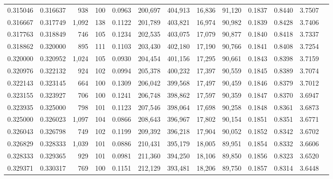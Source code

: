 \begin{tabular}{rrrrrrrrrrrrr}
0.315046 & 0.316637 &    938 &   100 &                                     0.0963 & 200,697 & 404,913 &  16,836 &  91,120 & 0.1837 & 0.8440 & 3.7507 \\
0.316667 & 0.317749 &  1,092 &   138 &                                     0.1122 & 201,789 & 403,821 &  16,974 &  90,982 & 0.1839 & 0.8428 & 3.7406 \\
0.317763 & 0.318849 &    746 &   105 &                                     0.1234 & 202,535 & 403,075 &  17,079 &  90,877 & 0.1840 & 0.8418 & 3.7337 \\
0.318862 & 0.320000 &    895 &   111 &                                     0.1103 & 203,430 & 402,180 &  17,190 &  90,766 & 0.1841 & 0.8408 & 3.7254 \\
0.320000 & 0.320952 &  1,024 &   105 &                                     0.0930 & 204,454 & 401,156 &  17,295 &  90,661 & 0.1843 & 0.8398 & 3.7159 \\
0.320976 & 0.322132 &    924 &   102 &                                     0.0994 & 205,378 & 400,232 &  17,397 &  90,559 & 0.1845 & 0.8389 & 3.7074 \\
0.322143 & 0.323145 &    664 &   100 &                                     0.1309 & 206,042 & 399,568 &  17,497 &  90,459 & 0.1846 & 0.8379 & 3.7012 \\
0.323155 & 0.323927 &    706 &   100 &                                     0.1241 & 206,748 & 398,862 &  17,597 &  90,359 & 0.1847 & 0.8370 & 3.6947 \\
0.323935 & 0.325000 &    798 &   101 &                                     0.1123 & 207,546 & 398,064 &  17,698 &  90,258 & 0.1848 & 0.8361 & 3.6873 \\
0.325000 & 0.326023 &  1,097 &   104 &                                     0.0866 & 208,643 & 396,967 &  17,802 &  90,154 & 0.1851 & 0.8351 & 3.6771 \\
0.326043 & 0.326798 &    749 &   102 &                                     0.1199 & 209,392 & 396,218 &  17,904 &  90,052 & 0.1852 & 0.8342 & 3.6702 \\
0.326829 & 0.328333 &  1,039 &   101 &                                     0.0886 & 210,431 & 395,179 &  18,005 &  89,951 & 0.1854 & 0.8332 & 3.6606 \\
0.328333 & 0.329365 &    929 &   101 &                                     0.0981 & 211,360 & 394,250 &  18,106 &  89,850 & 0.1856 & 0.8323 & 3.6520 \\
0.329371 & 0.330317 &    769 &   100 &                                     0.1151 & 212,129 & 393,481 &  18,206 &  89,750 & 0.1857 & 0.8314 & 3.6448 \\

\end{tabular}
